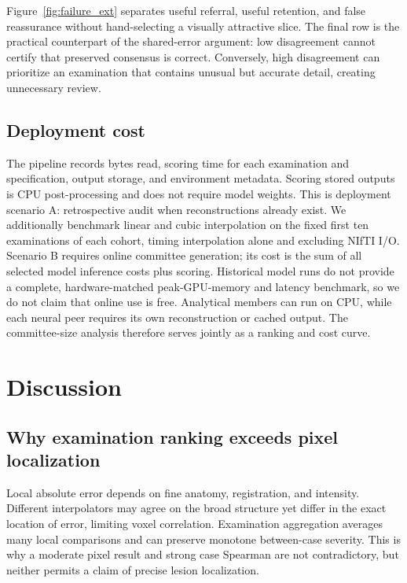 \documentclass{article}
\begin{document}
Figure~\ref{fig:failure_ext} separates useful referral, useful retention, and false reassurance without hand-selecting a visually attractive slice. The final row is the practical counterpart of the shared-error argument: low disagreement cannot certify that preserved consensus is correct. Conversely, high disagreement can prioritize an examination that contains unusual but accurate detail, creating unnecessary review.

\subsection{Deployment cost}
The pipeline records bytes read, scoring time for each examination and specification, output storage, and environment metadata. Scoring stored outputs is CPU post-processing and does not require model weights. This is deployment scenario A: retrospective audit when reconstructions already exist. We additionally benchmark linear and cubic interpolation on the fixed first ten examinations of each cohort, timing interpolation alone and excluding NIfTI I/O. Scenario B requires online committee generation; its cost is the sum of all selected model inference costs plus scoring. Historical model runs do not provide a complete, hardware-matched peak-GPU-memory and latency benchmark, so we do not claim that online use is free. Analytical members can run on CPU, while each neural peer requires its own reconstruction or cached output. The committee-size analysis therefore serves jointly as a ranking and cost curve.

\begin{table}[t]
 \centering
 \caption{Measured post-hoc cost. $^a$CPU interpolation only on 10 fixed examinations per cohort; NIfTI I/O excluded. Ground-truth I/O is excluded throughout.}
 \resizebox{\columnwidth}{!}{}
 \label{tab:cost_ext}
\end{table}

\clearpage
\section{Discussion}

\subsection{Why examination ranking exceeds pixel localization}
Local absolute error depends on fine anatomy, registration, and intensity. Different interpolators may agree on the broad structure yet differ in the exact location of error, limiting voxel correlation. Examination aggregation averages many local comparisons and can preserve monotone between-case severity. This is why a moderate pixel result and strong case Spearman are not contradictory, but neither permits a claim of precise lesion localization.
\end{document}
